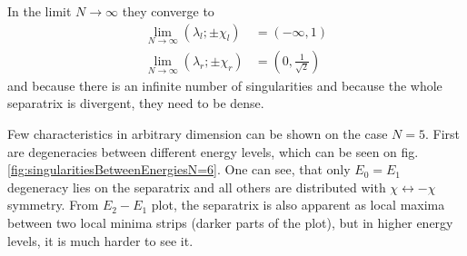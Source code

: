 In the limit $N\rightarrow\infty$ they converge to
\begin{align*}
    \lim_{N\rightarrow \infty}(\lambda_l ;\pm\chi_l)&= \left(-\infty,1\right)\\
    \lim_{N\rightarrow \infty}(\lambda_r ;\pm\chi_r)&= \left(0,\frac{1}{\sqrt{2}}\right)
\end{align*}
and because there is an infinite number of singularities and because the whole separatrix is divergent, they need to be dense.


Few characteristics in arbitrary dimension can be shown on the case $N=5$. First are degeneracies between different energy levels, which can be seen on fig. \ref{fig:singularitiesBetweenEnergiesN=6}. One can see, that only $E_0=E_1$ degeneracy lies on the separatrix and all others are distributed with $\chi\leftrightarrow-\chi$ symmetry. From $E_2-E_1$ plot, the separatrix is also apparent as local maxima between two local minima strips (darker parts of the plot), but in higher energy levels, it is much harder to see it.
 





